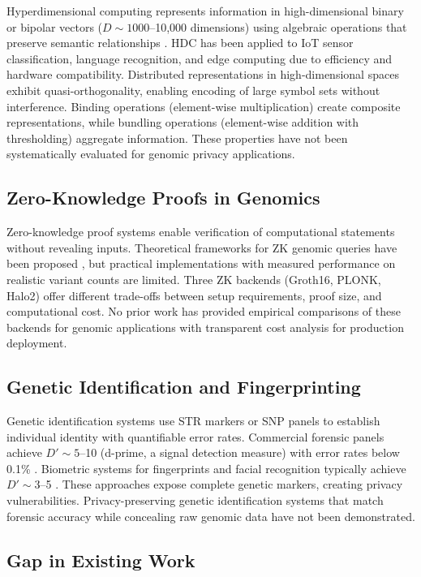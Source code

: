 \documentclass[11pt,letterpaper]{article}
\begin{document}
Hyperdimensional computing represents information in high-dimensional binary or bipolar vectors ($D \sim 1000$--10,000 dimensions) using algebraic operations that preserve semantic relationships \cite{karunaratne2021}. HDC has been applied to IoT sensor classification, language recognition, and edge computing due to efficiency and hardware compatibility. Distributed representations in high-dimensional spaces exhibit quasi-orthogonality, enabling encoding of large symbol sets without interference. Binding operations (element-wise multiplication) create composite representations, while bundling operations (element-wise addition with thresholding) aggregate information. These properties have not been systematically evaluated for genomic privacy applications.

\subsection{Zero-Knowledge Proofs in Genomics}

Zero-knowledge proof systems enable verification of computational statements without revealing inputs. Theoretical frameworks for ZK genomic queries have been proposed \cite{bogatyy2020,demmler2019}, but practical implementations with measured performance on realistic variant counts are limited. Three ZK backends (Groth16, PLONK, Halo2) offer different trade-offs between setup requirements, proof size, and computational cost. No prior work has provided empirical comparisons of these backends for genomic applications with transparent cost analysis for production deployment.

\subsection{Genetic Identification and Fingerprinting}

Genetic identification systems use STR markers or SNP panels to establish individual identity with quantifiable error rates. Commercial forensic panels achieve $D' \sim 5$--10 (d-prime, a signal detection measure) with error rates below 0.1\% \cite{butler2015}. Biometric systems for fingerprints and facial recognition typically achieve $D' \sim 3$--5 \cite{phillips2018}. These approaches expose complete genetic markers, creating privacy vulnerabilities. Privacy-preserving genetic identification systems that match forensic accuracy while concealing raw genomic data have not been demonstrated.

\subsection{Gap in Existing Work}
\end{document}
